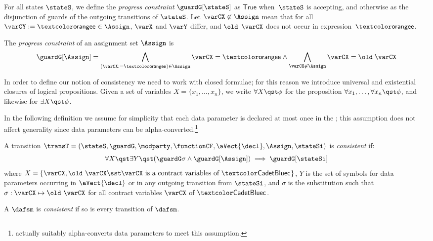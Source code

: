 \begin{definition}
  For all states $\stateS$, we define the \emph{progress constraint}
  $\guardG[\stateS]$ as $\mathsf{True}$ when~$\stateS$ is accepting,
  and otherwise as the disjunction of guards of the outgoing transitions of
  $\stateS$.
  Let $\varCX \not\in \Assign$ mean that for all
  $\varCY := \exprE \in \Assign$, $\varX$ and $\varY$ differ, and
  $\old$ $\varCX$ does not occur in expression~$\exprE$.

  The \emph{progress constraint} of an assignment %
  set $\Assign$ is
  \[
	 \guardG[\Assign] = \bigwedge_{(\varCX := \exprE) \in \Assign}
	 \varCX = \exprE \land \bigwedge_{\varCX \not\in \Assign} \varCX =
	 \old\; \varCX
  \]
\end{definition}

In order to define our notion of consistency we need to work with
closed formulae; for this reason we introduce universal and
existential closures of logical propositions.
%
Given a set of variables $X = \{x_1,\ldots,x_n\}$, we write
$\forall X \qst \phi$ for the proposition
$\forall x_1, \ldots, \forall x_n \qst \phi$, and likewise for
$\exists X \qst \phi$.


In the following definition we assume for simplicity that each data
parameter is declared at most once in the \modelname; this assumption
does not affect generality since data parameters can be
alpha-converted.\footnote{%
  \thetool actually suitably alpha-converts data parameters to meet
  this assumption.
}
\begin{definition}\label{def:consistency}
  A transition
  $\transT =
  (\stateS,\guardG,\modparty,\functionCF,\aVect{\decl},\Assign,\stateSi)$
  is \emph{consistent} if:%
  \[
	 \forall X \qst \exists Y \qst
	 (\guardG\sigma \land \guardG[\Assign]) \implies \guardG[\stateSi]
  \]
  where
  $X = \{\varCX, \old\ \varCX \sst \varCX \text{ is a contract
	 variables of } \contractC\}$, $Y$ is the set of symbols for data
  parameters occurring in $\aVect{\decl}$ or in any outgoing
  transition from $\stateSi$, and $\sigma$ is the substitution such
  that $\sigma : \varCX \mapsto \old\ \varCX$ for all contract
  variables $\varCX$ of $\contractC$.

  A \modelname $\dafsm$ is \emph{consistent} if so is every transition
  of $\dafsm$.
\end{definition}


